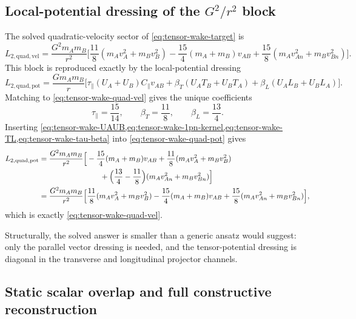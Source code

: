 \documentclass[11pt]{article}
\begin{document}
\subsection{Local-potential dressing of the \texorpdfstring{$G^2/r^2$}{G^2/r^2} block}
\label{app:tensor-wake-local-potential}

The solved quadratic-velocity sector of \cref{eq:tensor-wake-target} is
\begin{equation}
L_{2,\mathrm{quad,vel}}
=
\frac{G^2m_A m_B}{r^2}
\Big[
\frac{11}{8}(m_Av_A^2+m_Bv_B^2)
-\frac{15}{4}(m_A+m_B)v_{AB}
+\frac{15}{8}(m_Av_{An}^2+m_Bv_{Bn}^2)
\Big].
\label{eq:tensor-wake-quad-vel}
\end{equation}
This block is reproduced exactly by the local-potential dressing
\begin{equation}
L_{2,\mathrm{quad,pot}}
=
\frac{Gm_A m_B}{r}
\Big[
\tau_{\parallel}(U_A+U_B)C_{\parallel}v_{AB}
+\beta_T(U_AT_B+U_BT_A)
+\beta_L(U_AL_B+U_BL_A)
\Big].
\label{eq:tensor-wake-quad-pot}
\end{equation}
Matching to \cref{eq:tensor-wake-quad-vel} gives the unique coefficients
\begin{equation}
\tau_{\parallel}=\frac{15}{14},
\qquad
\beta_T=\frac{11}{8},
\qquad
\beta_L=\frac{13}{4}.
\label{eq:tensor-wake-tau-beta}
\end{equation}
Inserting \cref{eq:tensor-wake-UAUB,eq:tensor-wake-1pn-kernel,eq:tensor-wake-TL,eq:tensor-wake-tau-beta}
into \cref{eq:tensor-wake-quad-pot} gives
\begin{align}
L_{2,\mathrm{quad,pot}}
={}&
\frac{G^2m_A m_B}{r^2}
\Big[
-\frac{15}{4}(m_A+m_B)v_{AB}
+\frac{11}{8}(m_Av_A^2+m_Bv_B^2)
\notag\\
&\hspace{6.8em}
+\Bigl(\frac{13}{4}-\frac{11}{8}\Bigr)(m_Av_{An}^2+m_Bv_{Bn}^2)
\Big]
\notag\\
={}&
\frac{G^2m_A m_B}{r^2}
\Big[
\frac{11}{8}(m_Av_A^2+m_Bv_B^2)
-\frac{15}{4}(m_A+m_B)v_{AB}
+\frac{15}{8}(m_Av_{An}^2+m_Bv_{Bn}^2)
\Big],
\label{eq:tensor-wake-quad-pot-expanded}
\end{align}
which is exactly \cref{eq:tensor-wake-quad-vel}.

Structurally, the solved answer is smaller than a generic ansatz would suggest:
only the parallel vector dressing is needed, and the tensor-potential dressing is diagonal
in the transverse and longitudinal projector channels.

\subsection{Static scalar overlap and full constructive reconstruction}
\label{app:tensor-wake-full}
\end{document}

